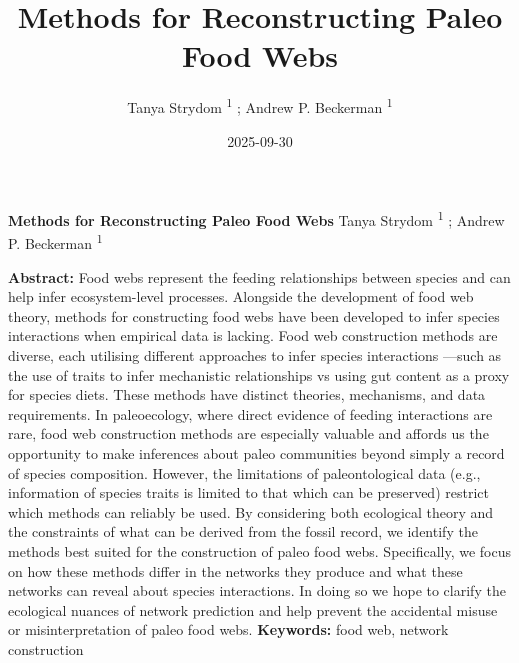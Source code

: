 \documentclass[
]{article}
\title{Methods for Reconstructing Paleo Food Webs}
\author{Tanya Strydom %
%
\textsuperscript{%
%
1%
}%
; Andrew P. Beckerman %
%
\textsuperscript{%
%
1%
}%
}
\date{2025-09-30}
\begin{document}
\thispagestyle{empty}
{\bfseries\sffamily\Large Methods for Reconstructing Paleo Food Webs}
\vfil
Tanya Strydom %
%
\textsuperscript{%
%
1%
}%
; Andrew P. Beckerman %
%
\textsuperscript{%
%
1%
}%

\vfil
{\small
\textbf{Abstract:} Food webs represent the feeding relationships between
species and can help infer ecosystem-level processes. Alongside the
development of food web theory, methods for constructing food webs have
been developed to infer species interactions when empirical data is
lacking. Food web construction methods are diverse, each utilising
different approaches to infer species interactions ---such as the use of
traits to infer mechanistic relationships vs using gut content as a
proxy for species diets. These methods have distinct theories,
mechanisms, and data requirements. In paleoecology, where direct
evidence of feeding interactions are rare, food web construction methods
are especially valuable and affords us the opportunity to make
inferences about paleo communities beyond simply a record of species
composition. However, the limitations of paleontological data (e.g.,
information of species traits is limited to that which can be preserved)
restrict which methods can reliably be used. By considering both
ecological theory and the constraints of what can be derived from the
fossil record, we identify the methods best suited for the construction
of paleo food webs. Specifically, we focus on how these methods differ
in the networks they produce and what these networks can reveal about
species interactions. In doing so we hope to clarify the ecological
nuances of network prediction and help prevent the accidental misuse or
misinterpretation of paleo food webs.
\vfil
\textbf{Keywords:} %
food web, %
network construction%
}
\clearpage
\setcounter{page}{1}
\doublespacing
\linenumbers
\end{document}
